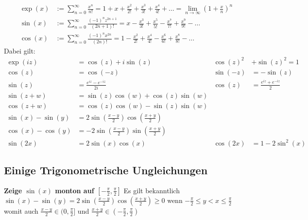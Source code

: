 \documentclass[25pt]{sciposter}
\begin{document}
\begin{multicols}{3}
\begin{align*}
	\operatorname{exp}(x) &:=\sum_{n=0}^{\infty} \frac{x^n}{n!} = 1 + x + \frac{x^2}{2!} + \frac{x^3}{3!} + \frac{x^4}{4!} +  \ldots = \lim_{n \to \infty} \left( 1 + \frac xn \right)^n\\
	\operatorname{sin}(x) &:=\sum_{n=0}^{\infty} \frac{(-1)^n z^{2n+1}}{(2n+1)!} = x - \frac{x^3}{3!}+ \frac{x^5}{5!} - \frac{x^7}{7!} +  \frac{x^9}{9!} - \ldots\\
	\operatorname{cos}(x) &:=\sum_{n=0}^{\infty} \frac{(-1)^n x^{2n}}{(2n)!} = 1 - \frac{x^2}{2!} + \frac{x^4}{4!} -\frac{x^6}{6!} + \frac{x^8}{8!} -\ldots 
\end{align*}
Dabei gilt:
\begin{align*}
\operatorname{exp}(iz) &= \cos (z) + i\sin(z) &  \cos(z) ^2 &+ \sin(z)^2 = 1\\
\cos(z) &= \cos(-z) & \sin (-z) &= - \sin(z) \\
\sin (z) &= \frac{e^{iz} - e^{-iz}}{2i} & \cos (z) &= \frac{e^{iz} + e^{-iz}}{2}\\
\sin(z+w) &= \sin(z) \cos(w) + \cos(z) \sin(w) \\
\cos(z + w) &= \cos(z) \cos(w) - \sin(z) \sin(w)\\
\sin(x) - \sin(y) &=  2 \sin \left(\frac{x-y}{2}\right) \cos \left(\frac{x+y}{2}\right)\\
\cos(x) - \cos(y) &= - 2 \sin \left(\frac{x-y}{2}\right) \sin \left(\frac{x+y}{2}\right)\\
\sin(2x) &= 2\sin(x)\cos(x) &  \cos(2x) &= 1 - 2\sin^2(x)
\end{align*}



\subsection*{Einige Trigonometrische Ungleichungen}

\textbf{Zeige $\sin(x)$ monton auf $[-\frac{\pi}{2}, \frac{\pi}{2}]$} Es gilt bekanntlich $\sin(x) - \sin(y) =  2 \sin \left(\frac{x-y}{2}\right) \cos \left(\frac{x+y}{2}\right) \geq 0$ wenn $-\frac{\pi}{2} \leq y < x \leq \frac{\pi}{2}$ womit auch $\frac{x-y}{2} \in (0,\frac{\pi}{2}]$ und $\frac{x+y}{2} \in (- \frac{\pi}{2}, \frac{\pi}{2})$\\



\end{multicols}
\end{document}
